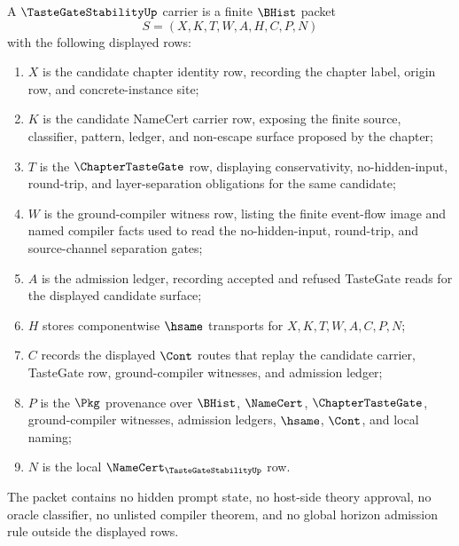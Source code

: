 \begin{definition}
\label{def:taste-gate-stability-carrier}
A $\TasteGateStabilityUp$ carrier is a finite $\BHist$ packet
$$
S=(X,K,T,W,A,H,C,P,N)
$$
with the following displayed rows:
\begin{enumerate}
\item $X$ is the candidate chapter identity row, recording the chapter label, origin row, and concrete-instance site;
\item $K$ is the candidate NameCert carrier row, exposing the finite source, classifier, pattern, ledger, and non-escape surface proposed by the chapter;
\item $T$ is the $\ChapterTasteGate$ row, displaying conservativity, no-hidden-input, round-trip, and layer-separation obligations for the same candidate;
\item $W$ is the ground-compiler witness row, listing the finite event-flow image and named compiler facts used to read the no-hidden-input, round-trip, and source-channel separation gates;
\item $A$ is the admission ledger, recording accepted and refused TasteGate reads for the displayed candidate surface;
\item $H$ stores componentwise $\hsame$ transports for $X,K,T,W,A,C,P,N$;
\item $C$ records the displayed $\Cont$ routes that replay the candidate carrier, TasteGate row, ground-compiler witnesses, and admission ledger;
\item $P$ is the $\Pkg$ provenance over $\BHist$, $\NameCert$, $\ChapterTasteGate$, ground-compiler witnesses, admission ledgers, $\hsame$, $\Cont$, and local naming;
\item $N$ is the local $\NameCert_{\TasteGateStabilityUp}$ row.
\end{enumerate}
The packet contains no hidden prompt state, no host-side theory approval, no oracle classifier, no unlisted compiler theorem, and no global horizon admission rule outside the displayed rows.
\end{definition}

